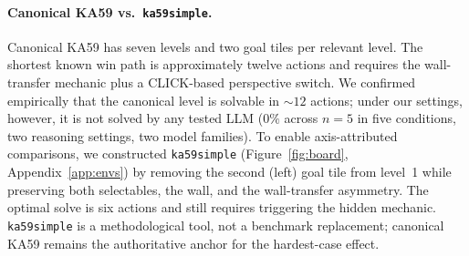 \documentclass{article}
\begin{document}
\paragraph{Canonical KA59 vs.~\texttt{ka59simple}.}
Canonical KA59 has seven levels and two goal tiles per relevant level. The shortest known win path is approximately twelve actions and requires the wall-transfer mechanic plus a CLICK-based perspective switch. We confirmed empirically that the canonical level is solvable in $\sim$$12$ actions; under our settings, however, it is not solved by any tested LLM ($0\%$ across $n=5$ in five conditions, two reasoning settings, two model families). To enable axis-attributed comparisons, we constructed \texttt{ka59simple} (Figure~\ref{fig:board}, Appendix~\ref{app:envs}) by removing the second (left) goal tile from level~1 while preserving both selectables, the wall, and the wall-transfer asymmetry. The optimal solve is six actions and still requires triggering the hidden mechanic. \texttt{ka59simple} is a methodological tool, not a benchmark replacement; canonical KA59 remains the authoritative anchor for the hardest-case effect.
\end{document}
